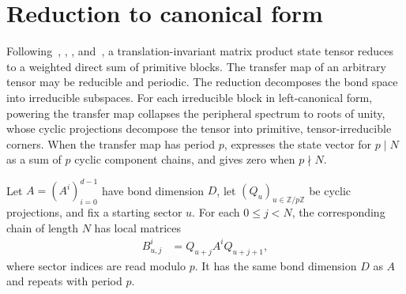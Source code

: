 \chapter{Reduction to canonical form}\label{ch:canonical}

Following~\cite{PerezGarcia2007Matrix},
\cite{Cirac2016MPDO_arXiv}, \cite{Cirac2021Matrix}, and~\cite[Chapter~6]{Wolf2012Quantum},
a translation-invariant matrix product state tensor reduces to a weighted direct
sum of primitive blocks.
The transfer map of an arbitrary tensor may be reducible and periodic.
The reduction decomposes the bond space into irreducible subspaces. For each
irreducible block in left-canonical form, powering the transfer map collapses the
peripheral spectrum to roots of unity, whose cyclic projections decompose the
tensor into primitive, tensor-irreducible corners. When the transfer map has
period $p$, \cite[Theorem~5]{PerezGarcia2007Matrix} expresses the state vector
for $p\mid N$ as a sum of $p$ cyclic component chains, and gives zero when $p\nmid N$.

\begin{definition}
    \label{def:pgvwc07_projector_component_chain}
    \leanok
    Let $A=(A^i)_{i=0}^{d-1}$ have bond dimension $D$, let
    $(Q_u)_{u\in\mathbb Z/p\mathbb Z}$ be cyclic projections, and fix a starting
    sector $u$. For each $0\le j<N$, the corresponding chain of length $N$
    has local matrices
    \begin{align}
        B_{u,j}^i
         & =Q_{u+j}A^iQ_{u+j+1},
        \label{eq:pgvwc07_projector_component_chain}
    \end{align}
    where sector indices are read modulo $p$. It has the same bond dimension
    $D$ as $A$ and repeats with period $p$.
\end{definition}

